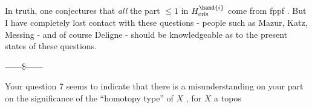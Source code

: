 In truth, one conjectures that \textit{all} the part  $\leq 1$ in $H^{\hand{i}}_{\text{cris}}$
come from fppf . But I have completely lost contact with these questions -
people such as Mazur, Katz, Messing - and of course Deligne - should be
knowledgeable as to the present states of these questions.

\begin{center}------\$------\end{center}

 Your question 7 seems to indicate that there is a misunderstanding on
your part on the significance of the ``homotopy type'' of $X$ , for $X$ a topos

